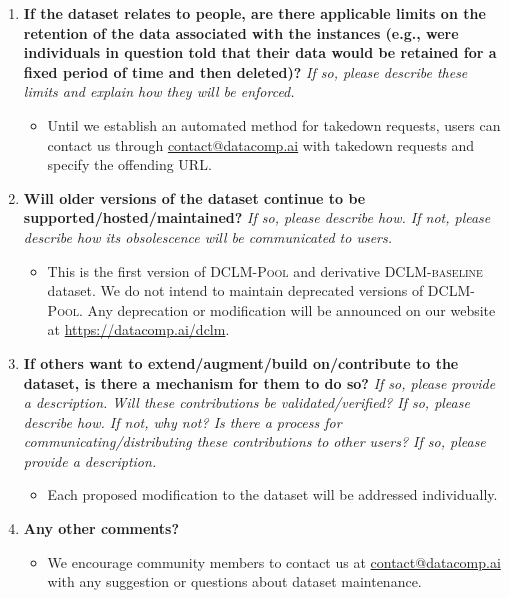 \documentclass{article}
\makeatletter
\newcommand{\rawpool}{\textsc{DCLM-Pool}\xspace}
\newcommand{\hqpool}{\textsc{DCLM-baseline}\xspace}
\newcommand{\ourcode}{\url{https://datacomp.ai/dclm}\xspace}
\newcommand{\contactus}{\url{contact@datacomp.ai}\xspace}
\makeatother
\begin{document}
\begin{enumerate}[label=Q\arabic*, resume]
\item \textbf{If the dataset relates to people, are there applicable limits on the retention of the data associated with the instances (e.g., were individuals in question told that their data would be retained for a fixed period of time and then deleted)?} \textit{If so, please describe these limits and explain how they will be enforced.}

\begin{itemize}
\item Until we establish an automated method for takedown requests, users can contact us through \contactus with takedown requests and specify the offending URL.
\end{itemize}

\item \textbf{Will older versions of the dataset continue to be supported/hosted/maintained?} \textit{If so, please describe how. If not, please describe how its obsolescence will be communicated to users.}

\begin{itemize}
\item This is the first version of \rawpool and derivative \hqpool dataset. We do not intend to maintain deprecated versions of \rawpool. Any deprecation or modification will be announced on our website at \ourcode.
\end{itemize}

\item \textbf{If others want to extend/augment/build on/contribute to the dataset, is there a mechanism for them to do so?} \textit{If so, please provide a description. Will these contributions be validated/verified? If so, please describe how. If not, why not? Is there a process for communicating/distributing these contributions to other users? If so, please provide a description.}

\begin{itemize}
\item Each proposed modification to the dataset will be addressed individually.
\end{itemize}

\item \textbf{Any other comments?}

\begin{itemize}
\item We encourage community members to contact us at \contactus with any suggestion or questions about dataset maintenance.
\end{itemize}

\end{enumerate}

\clearpage
\end{document}
